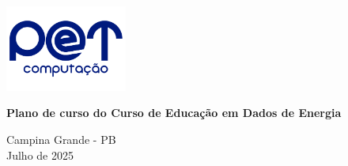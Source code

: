 \begin{titlepage}
    \centering
    
    \includegraphics[width=0.3\textwidth]{conteudo/logo-pet.png}\par
    
    \vspace*{\fill}

    {\Huge\bfseries Plano de curso do Curso de Educação em Dados de Energia \par}
    \vspace{5cm}
    
    \vspace*{\fill}
    
    {\large Campina Grande - PB \\ Julho de 2025 \par}
\end{titlepage}


